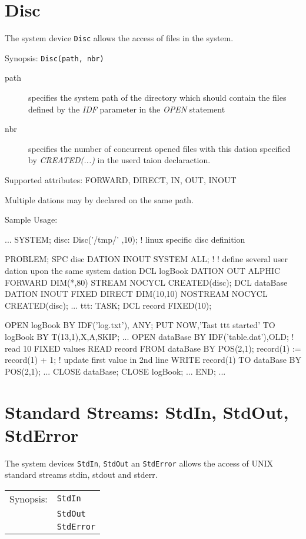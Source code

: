 \section{Disc}
The system device \verb|Disc| allows the access of files in the system.

Synopsis: \verb|Disc(path, nbr)|

\begin{description}
\item [path] specifies the system path of the directory which should contain
    the files defined by the {\em IDF} parameter in the {\em OPEN} statement
\item[nbr] specifies the number of concurrent opened files with this dation
     specified by {\em CREATED(...)} in the userd taion declaraction.
\end{description}

Supported attributes: FORWARD, DIRECT, IN, OUT, INOUT

Multiple dations may by declared on the same path.


Sample Usage:
\begin{PEARLCode}
...
SYSTEM;
   disc: Disc('/tmp/' ,10); ! linux specific disc definition

PROBLEM;
   SPC disc DATION INOUT SYSTEM ALL;
   !
   ! define several user dation upon the same system dation
   DCL logBook DATION OUT ALPHIC FORWARD DIM(*,80)
                      STREAM NOCYCL CREATED(disc);
   DCL dataBase DATION INOUT FIXED DIRECT DIM(10,10) 
                      NOSTREAM NOCYCL CREATED(disc);
...
ttt: TASK;
   DCL record FIXED(10);

   OPEN logBook BY IDF('log.txt'), ANY;
   PUT NOW,'Tast ttt started' TO logBook BY T(13,1),X,A,SKIP;
...
   OPEN dataBase BY IDF('table.dat'),OLD;
   ! read 10 FIXED values
   READ record FROM dataBase BY POS(2,1);
   record(1) := record(1) + 1;
   ! update first value in 2nd line
   WRITE record(1) TO dataBase BY POS(2,1);
...
   CLOSE dataBase;
   CLOSE logBook;
...
END;
...
\end{PEARLCode}

\section{Standard Streams: StdIn, StdOut, StdError}
The system devices \verb|StdIn|,
\verb|StdOut| an \verb|StdError| allows the access of UNIX standard streams
stdin, stdout and stderr.

\begin{tabular}{ll}
Synopsis: & \verb|StdIn| \\
          & \verb|StdOut| \\
          & \verb|StdError| \\
\end{tabular}

